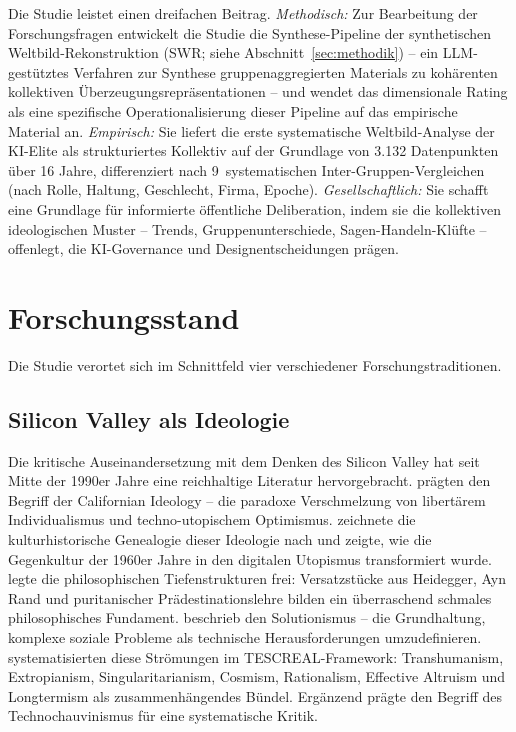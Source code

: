 \documentclass[12pt,a4paper]{article}
\begin{document}
Die Studie leistet einen dreifachen Beitrag. \emph{Methodisch:} Zur Bearbeitung der Forschungsfragen entwickelt die Studie die Synthese-Pipeline der synthetischen Weltbild-Rekonstruktion (SWR; siehe Abschnitt~\ref{sec:methodik}) -- ein LLM-gest\"utztes Verfahren zur Synthese gruppenaggregierten Materials zu koh\"arenten kollektiven \"Uberzeugungsrepr\"asentationen -- und wendet das dimensionale Rating als eine spezifische Operationalisierung dieser Pipeline auf das empirische Material an. \emph{Empirisch:} Sie liefert die erste systematische Weltbild-Analyse der KI-Elite als strukturiertes Kollektiv auf der Grundlage von 3.132 Datenpunkten \"uber 16 Jahre, differenziert nach 9~systematischen Inter-Gruppen-Vergleichen (nach Rolle, Haltung, Geschlecht, Firma, Epoche). \emph{Gesellschaftlich:} Sie schafft eine Grundlage f\"ur informierte \"offentliche Deliberation, indem sie die kollektiven ideologischen Muster -- Trends, Gruppenunterschiede, Sagen-Handeln-Kl\"ufte -- offenlegt, die KI-Governance und Designentscheidungen pr\"agen.


\section{Forschungsstand}
\label{sec:forschungsstand}

Die Studie verortet sich im Schnittfeld vier verschiedener Forschungstraditionen.

\subsection{Silicon Valley als Ideologie}
\label{sec:forschungsstand:sv}

Die kritische Auseinandersetzung mit dem Denken des Silicon Valley hat seit Mitte der 1990er Jahre eine reichhaltige Literatur hervorgebracht. \citet{BarbCam1996} pr\"agten den Begriff der \glqq Californian Ideology\grqq{} -- die paradoxe Verschmelzung von libert\"arem Individualismus und techno-utopischem Optimismus. \citet{Turner2006} zeichnete die kulturhistorische Genealogie dieser Ideologie nach und zeigte, wie die Gegenkultur der 1960er Jahre in den digitalen Utopismus transformiert wurde. \citet{Daub2020} legte die philosophischen Tiefenstrukturen frei: Versatzst\"ucke aus Heidegger, Ayn Rand und puritanischer Pr\"adestinationslehre bilden ein \glqq \"uberraschend schmales philosophisches Fundament\grqq. \citet{Morozov2013} beschrieb den Solutionismus -- die Grundhaltung, komplexe soziale Probleme als technische Herausforderungen umzudefinieren. \citet{TorresGebru2024} systematisierten diese Str\"omungen im TESCREAL-Framework: Transhumanism, Extropianism, Singularitarianism, Cosmism, Rationalism, Effective Altruism und Longtermism als \glqq zusammenh\"angendes B\"undel\grqq. Erg\"anzend pr\"agte \citet{Broussard2018} den Begriff des \glqq Technochauvinismus\grqq{} f\"ur eine systematische Kritik.
\end{document}

